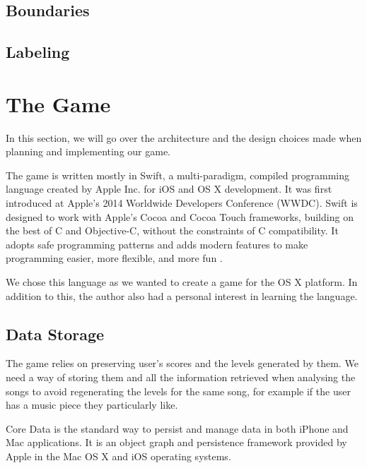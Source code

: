 \subsection{Boundaries}

\vspace{10pt}

\subsection{Labeling}

\vspace{20pt}








\section{The Game}

In this section, we will go over the architecture and the design choices made when planning and implementing our game.

The game is written mostly in Swift, a multi-paradigm, compiled programming language created by Apple Inc. for iOS and OS X development. 
It was first introduced at Apple's 2014 Worldwide Developers Conference (WWDC). Swift is designed to work with Apple's Cocoa and Cocoa Touch frameworks, building on the best of C and Objective-C, without the constraints of C compatibility. It adopts safe programming patterns and adds modern features to make programming easier, more flexible, and more fun \cite{swiftintro}. 

We chose this language as we wanted to create a game for the OS X platform. In addition to this, the author also had a personal interest in learning the language.

\vspace{10pt}

\subsection{Data Storage}

The game relies on preserving user's scores and the levels generated by them. We need a way of storing them and all the information retrieved when analysing the songs to avoid regenerating the levels for the same song, for example if the user has a music piece they particularly like.

Core Data is the standard way to persist and manage data in both iPhone and Mac applications. It is an object graph and persistence framework provided by Apple in the Mac OS X and iOS operating systems. 

